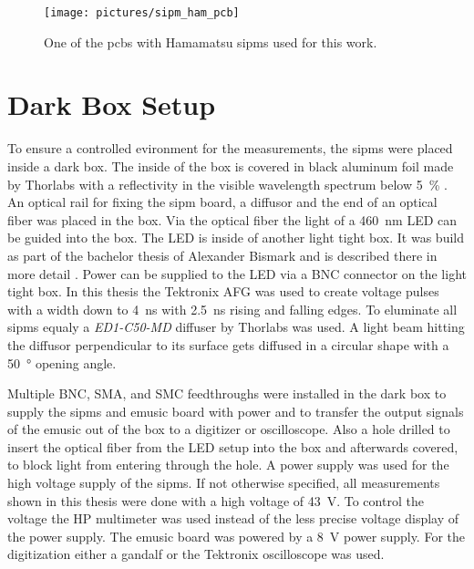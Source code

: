 \begin{figure}
	\centering
	\texttt{[image: pictures/sipm\_ham\_pcb]}
	\caption[\ac{pcb} with Hamamatsu \acp{sipm}]{One of the \acp{pcb} with Hamamatsu \acp{sipm} used for this work.}
	\label{fig:sipm_pcb}
\end{figure}

\section{Dark Box Setup}
To ensure a controlled evironment for the measurements, the \acp{sipm} were placed inside a dark box.
The inside of the box is covered in black aluminum foil made by Thorlabs with a reflectivity in the visible wavelength spectrum below \SI{5}{\percent} \cite{}.
An optical rail for fixing the \ac{sipm} board, a diffusor and the end of an optical fiber was placed in the box.
Via the optical fiber the light of a \SI{460}{\nano\meter} LED can be guided into the box.
The LED is inside of another light tight box.
It was build as part of the bachelor thesis of Alexander Bismark and is described there in more detail \cite{}.
Power can be supplied to the LED via a BNC connector on the light tight box.
In this thesis the Tektronix AFG was used to create voltage pulses with a width down to \SI{4}{\nano\second} with \SI{2.5}{\nano\second} rising and falling edges.
To eluminate all \acp{sipm} equaly a \textit{ED1-C50-MD} diffuser by Thorlabs was used.
A light beam hitting the diffusor perpendicular to its surface gets diffused in a circular shape with a \SI{50}{\degree} opening angle.

Multiple BNC, SMA, and SMC feedthroughs were installed in the dark box to supply the \acp{sipm} and \ac{emusic} board with power and to transfer the output signals of the \ac{emusic} out of the box to a digitizer or oscilloscope.
Also a hole drilled to insert the optical fiber from the LED setup into the box and afterwards covered, to block light from entering through the hole.
A power supply was used for the high voltage supply of the \acp{sipm}.
If not otherwise specified, all measurements shown in this thesis were done with a high voltage of \SI{43}{\volt}.
To control the voltage the HP multimeter was used instead of the less precise voltage display of the power supply.
The \ac{emusic} board was powered by a \SI{8}{\volt} power supply.
For the digitization either a \ac{gandalf} or the Tektronix oscilloscope was used.

